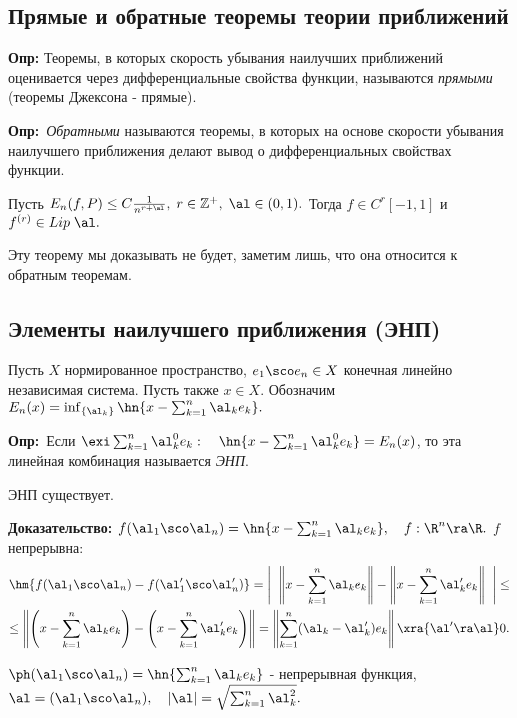 \documentclass[a4paper]{article}
\def\defin{\noindent\textbf{Опр:}\ }
\begin{document}
\subsection{Прямые и обратные теоремы теории приближений}
\textbf{Опр:} Теоремы, в которых скорость убывания наилучших приближений оценивается через дифференциальные
свойства функции, называются \emph{прямыми} (теоремы Джексона - прямые).

\defin \emph{Обратными} называются теоремы, в
которых на основе скорости убывания наилучшего приближения делают
вывод о дифференциальных свойствах функции.

\begin{theorems}[Бернштейн] Пусть $E_n(f,P)\le C
\frac1{n^{r+\al}},\; r\in\mathbb{Z}^{+},\;\al\in(0,1).$
Тогда $f\in C^r[-1,1]$ и \\\hangindent=5cm$f^{(r)}\in
Lip\;\al.$
\end{theorems}
Эту теорему мы доказывать не будет, заметим лишь, что она
относится к обратным теоремам.

\subsection{Элементы наилучшего приближения (ЭНП)}

Пусть $X$ нормированное пространство, $e_1\sco e_n\in X$ конечная линейно независимая система. Пусть также $x\in X$.
Обозначим $E_n(x)=\inf_{\{\al_k\}}\hn{x-\sum_{k=1}^n \al_k e_k}.$

\medskip\defin Если $\exi\sum_{k=1}^n \al_k^0
e_k:\quad\hn{x-\sum_{k=1}^n \al_k^0 e_k}=E_n(x)$, то эта
линейная комбинация называется \emph{ЭНП}.
\begin{theorems}
ЭНП существует.
\end{theorems}
\textbf{Доказательство:}
$f(\al_1\sco \al_n)=\hn{x-\sum_{k=1}^n \al_k e_k},\quad
f:\R ^n\ra \R .$ $f$ непрерывна:
\begin{multline*}
\hm{f(\al_1\sco \al_n)-f(\al_1'\sco \al_n')}=\left|\;\;\left\|x-\sum_{k=1}^n
\al_k e_k\right\|-\left\|x-\sum_{k=1}^n \al_k'
e_k\right\|\;\;\right|\le\\
\le\left\|\left(x-\sum_{k=1}^n \al_k
e_k\right)-\left(x-\sum_{k=1}^n \al_k'
e_k\right)\right\|=\left\|\sum_{k=1}^n (\al_k-\al_k')
e_k\right\|\xra{\al'\ra\al}0.
\end{multline*}

$\ph(\al_1\sco \al_n)=\hn{\sum_{k=1}^n \al_k e_k}$
 - непрерывная функция, $\al=(\al_1\sco \al_n),\quad|\al|=\sqrt{\sum_{k=1}^n\al_k^2}.$
\end{document}
